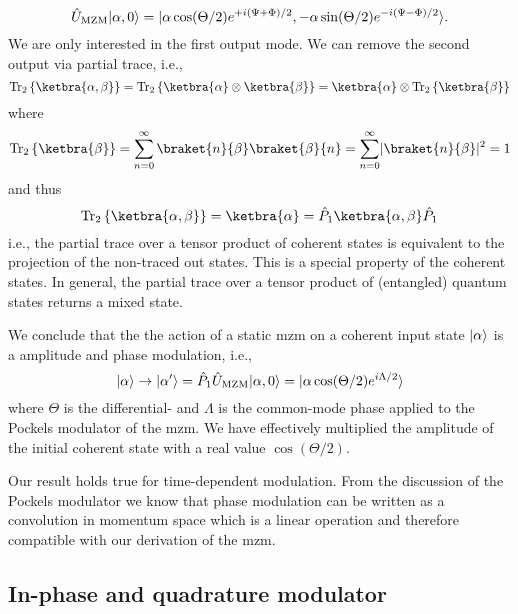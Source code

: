 \begin{equation}
	\hat{U}_\text{MZM}
	\lvert\alpha,0\rangle
	=
	\lvert\alpha\cos(\Theta/2)e^{+i(\Psi+\Phi)/2},-\alpha\sin(\Theta/2)e^{-i(\Psi-\Phi)/2}\rangle
	.
\end{equation}
We are only interested in the first output mode.
We can remove the second output via partial trace, i.e.,
\begin{equation}
	\trace_2\left\{
		\ketbra{\alpha,\beta}
	\right\}
	=
	\trace_2\left\{
		\ketbra{\alpha}
		\otimes
		\ketbra{\beta}
	\right\}
	=
	\ketbra{\alpha}
	\otimes
	\trace_2\left\{
		\ketbra{\beta}
	\right\}
\end{equation}
where
\begin{equation}
	\trace_2\left\{
		\ketbra{\beta}
	\right\}
	=
	\sum_{n=0}^\infty
	\braket{n}{\beta}
	\braket{\beta}{n}
	=
	\sum_{n=0}^\infty
	\abs{\braket{n}{\beta}}^2
	=
	1
\end{equation}
and thus
\begin{equation}
	\trace_2\left\{
		\ketbra{\alpha,\beta}
	\right\}
	=
	\ketbra{\alpha}
	=
	\hat{P}_1
	\ketbra{\alpha,\beta}
	\hat{P}_1
\end{equation}
i.e., the partial trace over a tensor product of coherent states is equivalent to the projection of the non-traced out states.
This is a special property of the coherent states.
In general, the partial trace over a tensor product of (entangled) quantum states returns a mixed state.

We conclude that the the action of a static \gls{mzm} on a coherent input state $\lvert\alpha\rangle$ is a amplitude and phase modulation, i.e.,
\begin{equation}
	\lvert\alpha\rangle
	\to
	\lvert\alpha^\prime\rangle
	=
	\hat{P}_1
	\hat{U}_\text{MZM}
	\lvert\alpha,0\rangle
	=
	\lvert\alpha\cos(\Theta/2)e^{i\Lambda/2}\rangle
	\label{eq:mzm_transform}
\end{equation}
where $\Theta$ is the differential- and $\Lambda$ is the common-mode phase applied to the Pockels modulator of the \gls{mzm}.
We have effectively multiplied the amplitude of the initial coherent state with a real value $\cos(\Theta/2)$.

Our result holds true for time-dependent modulation.
From the discussion of the Pockels modulator we know that phase modulation can be written as a convolution in momentum space which is a linear operation and therefore compatible with our derivation of the \gls{mzm}.

\subsection{In-phase and quadrature modulator}

